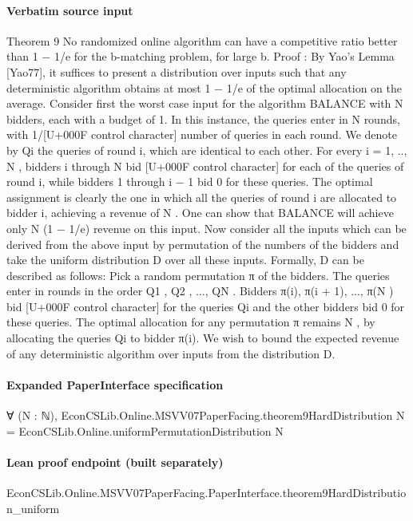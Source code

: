 \documentclass[10pt]{article}
\begin{document}
\paragraph{Verbatim source input}
\begin{ReviewVerbatim}
Theorem 9 No randomized online algorithm can have a competitive ratio better than 1 − 1/e
for the b-matching problem, for large b.
Proof : By Yao’s Lemma [Yao77], it suffices to present a distribution over inputs such that
any deterministic algorithm obtains at most 1 − 1/e of the optimal allocation on the average.
Consider first the worst case input for the algorithm BALANCE with N bidders, each with
a budget of 1. In this instance, the queries enter in N rounds, with 1/[U+000F control character] number of queries in
each round. We denote by Qi the queries of round i, which are identical to each other. For
every i = 1, .., N , bidders i through N bid [U+000F control character] for each of the queries of round i, while bidders 1
through i − 1 bid 0 for these queries. The optimal assignment is clearly the one in which all
the queries of round i are allocated to bidder i, achieving a revenue of N . One can show that
BALANCE will achieve only N (1 − 1/e) revenue on this input.
Now consider all the inputs which can be derived from the above input by permutation of the
numbers of the bidders and take the uniform distribution D over all these inputs. Formally, D
can be described as follows: Pick a random permutation π of the bidders. The queries enter
in rounds in the order Q1 , Q2 , ..., QN . Bidders π(i), π(i + 1), ..., π(N ) bid [U+000F control character] for the queries Qi
and the other bidders bid 0 for these queries. The optimal allocation for any permutation
π remains N , by allocating the queries Qi to bidder π(i). We wish to bound the expected
revenue of any deterministic algorithm over inputs from the distribution D.
\end{ReviewVerbatim}


\paragraph{Expanded PaperInterface specification}
\begin{ReviewVerbatim}
∀ (N : ℕ),
  EconCSLib.Online.MSVV07PaperFacing.theorem9HardDistribution N = EconCSLib.Online.uniformPermutationDistribution N
\end{ReviewVerbatim}

\paragraph{Lean proof endpoint (built separately)}\begin{ReviewVerbatim}
EconCSLib.Online.MSVV07PaperFacing.PaperInterface.theorem9HardDistribution_uniform
\end{ReviewVerbatim}
\end{document}
